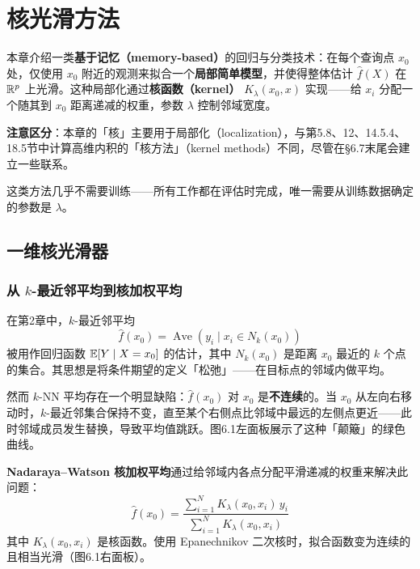 \chapter{核光滑方法}


本章介绍一类\textbf{基于记忆（memory-based）}的回归与分类技术：在每个查询点 $x_0$ 处，仅使用 $x_0$ 附近的观测来拟合一个\textbf{局部简单模型}，并使得整体估计 $\hat{f}(X)$ 在 $\mathbb{R}^p$ 上光滑。这种局部化通过\textbf{核函数（kernel）} $K_\lambda(x_0, x)$ 实现——给 $x_i$ 分配一个随其到 $x_0$ 距离递减的权重，参数 $\lambda$ 控制邻域宽度。

\textbf{注意区分}：本章的「核」主要用于局部化（localization），与第5.8、12、14.5.4、18.5节中计算高维内积的「核方法」（kernel methods）不同，尽管在§6.7末尾会建立一些联系。

这类方法几乎不需要训练——所有工作都在评估时完成，唯一需要从训练数据确定的参数是 $\lambda$。

\section{一维核光滑器}

\subsection{从 $k$-最近邻平均到核加权平均}

在第2章中，$k$-最近邻平均
\begin{equation}\label{eq:knn_avg}
    \hat{f}(x_0) = \operatorname{Ave}(y_i \mid x_i \in N_k(x_0))
\end{equation}
被用作回归函数 $\mathbb{E}[Y \mid X = x_0]$ 的估计，其中 $N_k(x_0)$ 是距离 $x_0$ 最近的 $k$ 个点的集合。其思想是将条件期望的定义「松弛」——在目标点的邻域内做平均。

然而 $k$-NN 平均存在一个明显缺陷：$\hat{f}(x_0)$ 对 $x_0$ 是\textbf{不连续}的。当 $x_0$ 从左向右移动时，$k$-最近邻集合保持不变，直至某个右侧点比邻域中最远的左侧点更近——此时邻域成员发生替换，导致平均值跳跃。图6.1左面板展示了这种「颠簸」的绿色曲线。

\textbf{Nadaraya--Watson 核加权平均}通过给邻域内各点分配平滑递减的权重来解决此问题：
\begin{equation}\label{eq:nw_kernel}
    \hat{f}(x_0) = \frac{\sum_{i=1}^{N} K_\lambda(x_0, x_i) \, y_i}{\sum_{i=1}^{N} K_\lambda(x_0, x_i)}
\end{equation}
其中 $K_\lambda(x_0, x_i)$ 是核函数。使用 Epanechnikov 二次核时，拟合函数变为连续的且相当光滑（图6.1右面板）。

